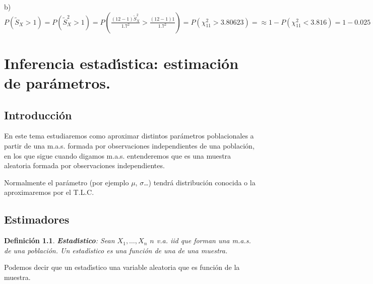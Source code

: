 \documentclass[12pt]{report}
\newtheorem{definition}{Definici\'on}
\begin{document}
b)
$P(\tilde{S}_{X}>1)=P(\tilde{S}_{X}^2>1)=P(\frac{(12-1)\tilde{S}_{X}^2}{1.7^2}>\frac{(12-1)
1}{1.7^2})=P(\chi_{11}^2>3.80623)=\approx 1-P(\chi_{11}^2<3.816)=1-0.025=0.975$




%
%
%
%
%








  \chapter{ Inferencia estad\'{\i}stica: estimaci\'on de par\'ametros.}

  \section{Introducci\'on}

  En este tema estudiaremos como aproximar distintos par\'ametros
  poblacionales a partir de una m.a.s.
  formada por observaciones independientes de una  poblaci\'on, en los que sigue cuando digamos m.a.s. entenderemos
  que es una muestra aleatoria formada por observaciones independientes.

  Normalmente el par\'ametro (por ejemplo $\mu$, $\sigma$\ldots)
     tendr\'a distribuci\'on conocida o la aproximaremos por el T.L.C.

\section{Estimadores}

  \begin{definition}\textbf{Estad\'{\i}stico}: Sean $X_1,\ldots,X_n$ $n$ v.a. iid que forman una m.a.s.
  de una poblaci\'on. Un estad\'{\i}stico es una funci\'on de una de una
  muestra.
  \end{definition}
   Podemos decir que un estad\'{\i}stico una variable
  aleatoria que es funci\'on de la muestra.
\end{document}
